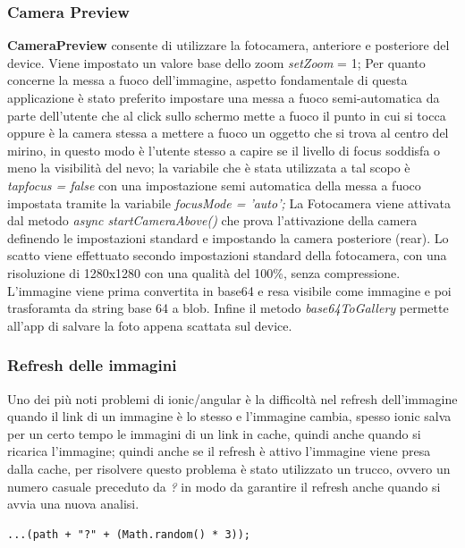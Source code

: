 {\subsubsection{Camera Preview}
\textbf{CameraPreview} consente di utilizzare la fotocamera, anteriore e posteriore del device.
Viene impostato un valore base dello zoom \textit{setZoom} = 1;
Per quanto concerne la messa a fuoco dell'immagine, aspetto fondamentale di questa applicazione è stato preferito impostare una messa a fuoco semi-automatica da parte dell'utente che al click sullo schermo mette a fuoco il punto in cui si tocca oppure è la camera stessa a mettere a fuoco un oggetto che si trova al centro del mirino, in questo modo è l'utente stesso a capire se il livello di focus soddisfa o meno la visibilità del nevo;
\newline
la variabile che è stata utilizzata a tal scopo è \textit{tapfocus = false} con una impostazione semi automatica della messa a fuoco impostata tramite la variabile \textit{focusMode = 'auto';}
\newline
La Fotocamera viene attivata dal metodo \textit{async startCameraAbove()} che prova l'attivazione della camera definendo le impostazioni standard e impostando la camera posteriore (rear).
\newline
Lo scatto viene effettuato secondo impostazioni standard della fotocamera, con una risoluzione di 1280x1280 con una qualità del 100\%, senza compressione. 
\newline
L'immagine viene prima convertita in base64 e resa visibile come immagine e poi trasforamta da string base 64 a blob.
\newline
Infine il metodo \textit{base64ToGallery} permette all'app di salvare la foto appena scattata sul device.
\newline
\subsubsection{Refresh delle immagini}
Uno dei più noti problemi di ionic/angular è la difficoltà nel refresh dell'immagine quando il link di un immagine è lo stesso e l'immagine cambia, spesso ionic salva per un certo tempo le immagini di un link in cache, quindi anche quando si ricarica l'immagine; quindi anche se il refresh è attivo l'immagine viene presa dalla cache, per risolvere questo problema è stato utilizzato un trucco, ovvero un numero casuale preceduto da \textit{?} in modo da garantire il refresh anche quando si avvia una nuova analisi.
\begin{lstlisting}
...(path + "?" + (Math.random() * 3));
\end{lstlisting}
\newpage
}
